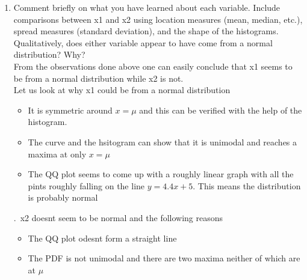 \documentclass[fontsize=10pt]{scrartcl}
\begin{document}
\begin{enumerate}
		\item
		Comment briefly on what you have learned about each variable. Include comparisons between x1 and x2 using location measures (mean, median, etc.), spread measures (standard deviation), and the shape of the histograms. Qualitatively, does either variable appear to have come from a normal distribution? Why? \\

		From the observations done above one can easily conclude that x1 seems to be from a normal distribution while x2 is not. \\

		Let us look at why x1 could be from a normal distribution \\
		\begin{itemize}
			\item
			It is symmetric around $x=\mu$ and this can be verified with the help of the histogram.

			\item
			The curve and the hsitogram can show that it is unimodal and reaches a maxima at only $x=\mu$

			\item
			The QQ plot seems to come up with a roughly linear graph with all the pints roughly falling on the line $y=4.4x +5$. This means the distribution is probably normal
		\end{itemize}
		.\
		x2 doesnt seem to be normal and the following reasons 
		\begin{itemize}
			\item
			The QQ plot odesnt form a straight line

			\item
			The PDF is not unimodal and there are two maxima neither of which are at $\mu$
		\end{itemize}


	\end{enumerate}
	
\end{document}

